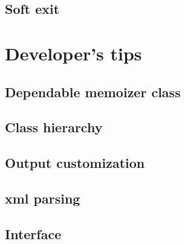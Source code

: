 \documentclass[12pt,fleqn]{report}
\begin{document}
\section{Soft exit}

\chapter{Developer's tips}
\section{Dependable memoizer class}
\section{Class hierarchy}
\section{Output customization}
\section{xml parsing}
\section{Interface}

\begin{thebibliography}{99}
\end{thebibliography}
\end{document}
